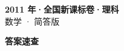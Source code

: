 \documentclass[zihao=-4, a4paper]{ctexart}
\begin{document}
\begin{center}
  {\Large\bfseries 2011 年·全国新课标卷·理科}\\[4pt]
  {\large 数学 · 简答版}
\end{center}
\medskip
{}

\clearpage
{}
\begin{center}{\Large\bfseries 答案速查}\end{center}
\medskip

\end{document}
